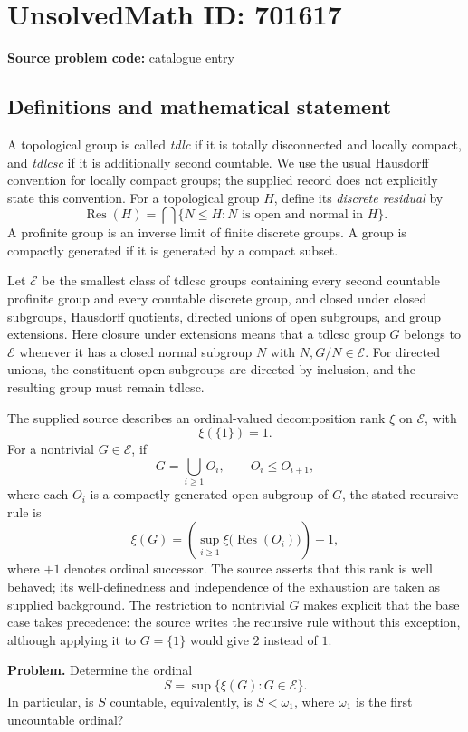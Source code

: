 \documentclass[11pt]{article}
\begin{document}
\section*{UnsolvedMath ID: 701617}
\textbf{Source problem code:} catalogue entry
\subsection{Definitions and mathematical statement}
A topological group is called \emph{tdlc} if it is totally disconnected and locally compact, and \emph{tdlcsc} if it is additionally second countable. We use the usual Hausdorff convention for locally compact groups; the supplied record does not explicitly state this convention. For a topological group \(H\), define its \emph{discrete residual} by
\[
\operatorname{Res}(H)=\bigcap\{N\leq H:N\text{ is open and normal in }H\}.
\]
A profinite group is an inverse limit of finite discrete groups. A group is compactly generated if it is generated by a compact subset.

Let \(\mathscr{E}\) be the smallest class of tdlcsc groups containing every second countable profinite group and every countable discrete group, and closed under closed subgroups, Hausdorff quotients, directed unions of open subgroups, and group extensions. Here closure under extensions means that a tdlcsc group \(G\) belongs to \(\mathscr{E}\) whenever it has a closed normal subgroup \(N\) with \(N,G/N\in\mathscr{E}\). For directed unions, the constituent open subgroups are directed by inclusion, and the resulting group must remain tdlcsc.

The supplied source describes an ordinal-valued decomposition rank \(\xi\) on \(\mathscr{E}\), with
\[
\xi(\{1\})=1.
\]
For a nontrivial \(G\in\mathscr{E}\), if
\[
G=\bigcup_{i\geq 1}O_i,\qquad O_i\leq O_{i+1},
\]
where each \(O_i\) is a compactly generated open subgroup of \(G\), the stated recursive rule is
\[
\xi(G)=\left(\sup_{i\geq 1}\xi\bigl(\operatorname{Res}(O_i)\bigr)\right)+1,
\]
where \(+1\) denotes ordinal successor. The source asserts that this rank is well behaved; its well-definedness and independence of the exhaustion are taken as supplied background. The restriction to nontrivial \(G\) makes explicit that the base case takes precedence: the source writes the recursive rule without this exception, although applying it to \(G=\{1\}\) would give \(2\) instead of \(1\).

\textbf{Problem.} Determine the ordinal
\[
S=\sup\{\xi(G):G\in\mathscr{E}\}.
\]
In particular, is \(S\) countable, equivalently, is \(S<\omega_1\), where \(\omega_1\) is the first uncountable ordinal?
\end{document}
